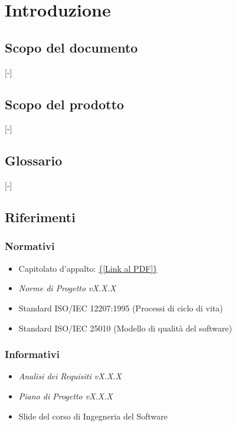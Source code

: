 \section{Introduzione}

\subsection{Scopo del documento}
[-]

\subsection{Scopo del prodotto}
[-]

\subsection{Glossario}
[-]

\subsection{Riferimenti}
\subsubsection{Normativi}
\begin{itemize}
	\item Capitolato d'appalto: \url{{[Link al PDF]}}
	\item \textit{Norme di Progetto vX.X.X}
	\item Standard ISO/IEC 12207:1995 (Processi di ciclo di vita)
	\item Standard ISO/IEC 25010 (Modello di qualità del software)
\end{itemize}
\subsubsection{Informativi}
\begin{itemize}
	\item \textit{Analisi dei Requisiti vX.X.X}
	\item \textit{Piano di Progetto vX.X.X}
	\item Slide del corso di Ingegneria del Software
\end{itemize}